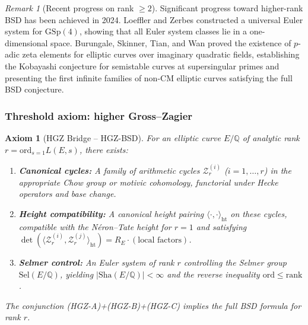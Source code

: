 \documentclass[aps,prd,twocolumn,superscriptaddress,nofootinbib]{revtex4-2}
\newtheorem{axiom}[theorem]{Axiom}
\theoremstyle{definition}
\theoremstyle{remark}
\newtheorem{remark}[theorem]{Remark}
\begin{document}
\begin{remark}[Recent progress on rank $\geq 2$]\label{rem:recent-bsd}
Significant progress toward higher-rank BSD has been achieved in 2024. Loeffler and Zerbes \cite{LoefflerZerbes2024} constructed a universal Euler system for $\mathrm{GSp}(4)$, showing that all Euler system classes lie in a one-dimensional space. Burungale, Skinner, Tian, and Wan \cite{BSTW2024} proved the existence of $p$-adic zeta elements for elliptic curves over imaginary quadratic fields, establishing the Kobayashi conjecture for semistable curves at supersingular primes and presenting the first infinite families of non-CM elliptic curves satisfying the full BSD conjecture.
\end{remark}

\subsubsection*{Threshold axiom: higher Gross--Zagier}

\begin{axiom}[HGZ Bridge -- HGZ-BSD]\label{ax:hgz-bsd}
For an elliptic curve $E/\mathbb{Q}$ of analytic rank $r = \mathrm{ord}_{s=1} L(E,s)$, there exists:
\begin{enumerate}
\item[(HGZ-A)] \textbf{Canonical cycles:} A family of arithmetic cycles $\mathcal{Z}_r^{(i)}$ ($i = 1, \ldots, r$) in the appropriate Chow group or motivic cohomology, functorial under Hecke operators and base change.
\item[(HGZ-B)] \textbf{Height compatibility:} A canonical height pairing $\langle \cdot, \cdot \rangle_{\mathrm{ht}}$ on these cycles, compatible with the N\'eron--Tate height for $r=1$ and satisfying $\det(\langle \mathcal{Z}_r^{(i)}, \mathcal{Z}_r^{(j)} \rangle_{\mathrm{ht}}) = R_E \cdot (\text{local factors})$.
\item[(HGZ-C)] \textbf{Selmer control:} An Euler system of rank $r$ controlling the Selmer group $\mathrm{Sel}(E/\mathbb{Q})$, yielding $|\mathrm{Sha}(E/\mathbb{Q})| < \infty$ and the reverse inequality $\mathrm{ord} \leq \mathrm{rank}$.
\end{enumerate}
The conjunction (HGZ-A)+(HGZ-B)+(HGZ-C) implies the full BSD formula for rank $r$.
\end{axiom}
\end{document}
